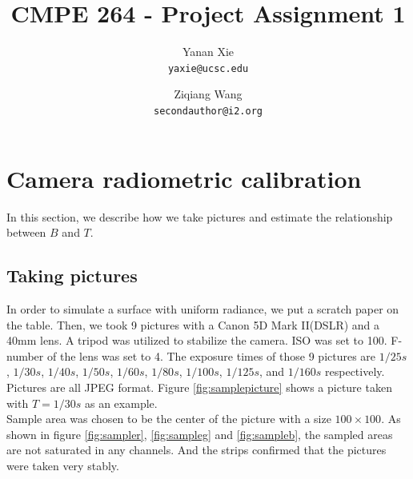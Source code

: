 \documentclass[10pt,twocolumn,letterpaper]{article}
\begin{document}
\title{CMPE 264 - Project Assignment 1}

\author{Yanan Xie\\
{\tt\small yaxie@ucsc.edu}
\and
Ziqiang Wang\\
{\tt\small secondauthor@i2.org}
}

\maketitle


\section{Camera radiometric calibration}

In this section, we describe how we take pictures and estimate the relationship between $B$ and $T$.

\subsection{Taking pictures}

In order to simulate a surface with uniform radiance, we put a scratch paper on the table. Then, we took 9 pictures with a Canon 5D Mark II(DSLR) and a 40mm lens. A tripod was utilized to stabilize the camera. ISO was set to 100. F-number of the lens was set to 4. The exposure times of those 9 pictures are $1/25s$, $1/30s$, $1/40s$, $1/50s$, $1/60s$, $1/80s$, $1/100s$, $1/125s$, and $1/160s$ respectively. Pictures are all JPEG format. Figure \ref{fig:samplepicture} shows a picture taken with $T = 1/30s$ as an example. \\

Sample area was chosen to be the center of the picture with a size $100\times 100$. As shown in figure \ref{fig:sampler}, \ref{fig:sampleg} and \ref{fig:sampleb}, the sampled areas are not saturated in any channels. And the strips confirmed that the pictures were taken very stably.
\end{document}
